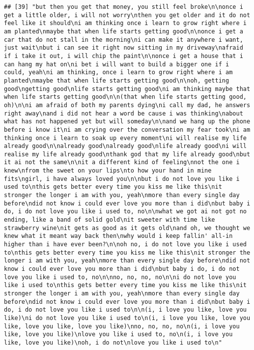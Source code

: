 \documentclass[]{article}
\begin{document}
\begin{verbatim}
## [39] "but then you get that money, you still feel broke\n\nonce i get a little older, i will not worry\nthen you get older and it do not feel like it should\ni am thinking once i learn to grow right where i am planted\nmaybe that when life starts getting good\n\nonce i get a car that do not stall in the morning\ni can make it anywhere i want, just wait\nbut i can see it right now sitting in my driveway\nafraid if i take it out, i will chip the paint\n\nonce i get a house that i can hang my hat on\ni bet i will want to build a bigger one if i could, yeah\ni am thinking, once i learn to grow right where i am planted\nmaybe that when life starts getting good\n\noh, getting good\ngetting good\nlife starts getting good\ni am thinking maybe that when life starts getting good\n\n(that when life starts getting good, oh)\n\ni am afraid of both my parents dying\ni call my dad, he answers right away\nand i did not hear a word be cause i was thinking\nabout what has not happened yet but will someday\n\nand we hang up the phone before i know it\ni am crying over the conversation my fear took\ni am thinking once i learn to soak up every moment\ni will realise my life already good\n\nalready good\nalready good\nlife already good\ni will realise my life already good\nthank god that my life already good\nbut it ai not the same\n\nit a different kind of feeling\nnot the one i knew\nfrom the sweet on your lips\nto how your hand in mine fits\ngirl, i have always loved you\n\nbut i do not love you like i used to\nthis gets better every time you kiss me like this\nit stronger the longer i am with you, yeah\nmore than every single day before\ndid not know i could ever love you more than i did\nbut baby i do, i do not love you like i used to, no\n\nwhat we got ai not got no ending, like a band of solid gold\nit sweeter with time like strawberry wine\nit gets as good as it gets old\nand oh, we thought we knew what it meant way back then\nwhy would i keep fallin' all-in higher than i have ever been?\n\noh no, i do not love you like i used to\nthis gets better every time you kiss me like this\nit stronger the longer i am with you, yeah\nmore than every single day before\ndid not know i could ever love you more than i did\nbut baby i do, i do not love you like i used to, no\n\nno, no, no, no\n\ni do not love you like i used to\nthis gets better every time you kiss me like this\nit stronger the longer i am with you, yeah\nmore than every single day before\ndid not know i could ever love you more than i did\nbut baby i do, i do not love you like i used to\n\n(i, i love you like, love you like)\ni do not love you like i used to\n(i, i love you like, love you like, love you like, love you like)\nno, no, no, no\n(i, i love you like, love you like)\nlove you like i used to, no\n(i, i love you like, love you like)\noh, i do not\nlove you like i used to\n"

\end{verbatim}
\end{document}
